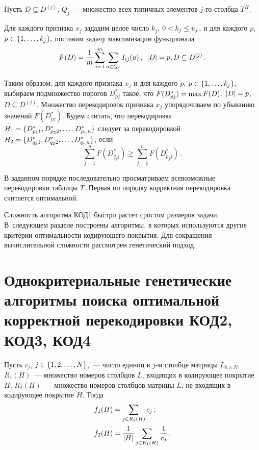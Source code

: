 \begin{multicols}{2}
Пусть $D \subseteq D^{(j)}$, $Q_j$~--- множество всех типичных элементов $j$-го столбца $T^H$.

Для каждого признака $x_j$ зададим целое число $k_j$, $0\hm<k_j\hm\leq u_j$,
и для каждого $p$, $p\hm\in \{1,\ldots ,k_j\},$ поставим задачу максимизации
функционала
$$
    F(D)=\displaystyle\frac{\displaystyle 1\mathstrut}{\displaystyle m\mathstrut} \sum\limits^m_{i=1} \sum\limits_{a\in Q_j} I_{ij}(a)\,, 
    \enskip |D|=p, D \subseteq D^{(j)}\,.
$$

Таким образом, для каждого признака $x_j$ и для каждого $p$, $p\hm\in
\{1,\ldots ,k_j\},$ выбираем подмножество порогов $D^*_{pj}$ такое, что
$F(D^*_{pj})\hm=\max F(D)$, $|D|\hm=p$, $D \subseteq D^{(j)}$. Множество
перекодировок признака $x_j$ упорядочиваем по убыванию значений
$F(D^*_{pj})$. Будем считать, что перекодировка
$H_1\hm=\{D^*_{p_11},D^*_{p_22},\ldots ,D^*_{p_nn}\}$ следует за
перекодировкой $H_2\hm=\{D^*_{q_11},D^*_{q_22},\ldots ,D^*_{q_nn}\}$, если
$$
    \sum\limits^n_{j=1}F(D^*_{q_jj})\geq \sum\limits^n_{j=1}F(D^*_{p_jj})\,.
$$

В заданном порядке последовательно просматриваем всевозможные
перекодировки таблицы $T$. Первая по порядку корректная
перекодировка считается оптимальной.

Сложность алгоритма КОД1 быстро растет с\linebreak рос\-том размеров задачи. 
В~следующем разделе построены алгоритмы, в которых используются другие
критерии оптимальности кодирующего покрытия. Для сокращения
вычислительной сложности рассмотрен генетический подход.

\vspace*{-9pt}

\section{Однокритериальные генетические алгоритмы поиска оптимальной корректной 
перекодировки КОД2, КОД3, КОД4}

\vspace*{-2pt}

Пусть $c_j$, $j \hm\in \{1,2,\ldots ,N\}$,~--- число единиц в $j$-м столбце
матрицы $L_{h \times N}$, $R_1(H)$~--- множество номеров столбцов
$L$, входящих в кодирующее покрытие $H$, $R_2(H)$~--- множество
номеров столбцов матрицы $L$, не входящих в кодирующее покрытие $H$.
Тогда
\begin{align*}
    f_1(H) &= \sum\limits_{j \in R_2(H)} c_j\,;
\\
    f_2(H) &= \displaystyle\frac{\displaystyle 1\mathstrut}{\displaystyle |H|\mathstrut}\sum\limits_{j \in R_1(H)}\displaystyle\frac{\displaystyle 1\mathstrut}{\displaystyle c_j\mathstrut}\,.
\end{align*}


\end{multicols}
